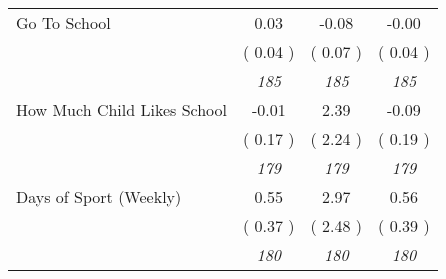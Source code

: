 \begin{tabular}{l c c c}
Go To School &      0.03 &     -0.08 &     -0.00 \\
& (     0.04 ) & (     0.07 ) & (     0.04 ) \\
& \textit{ 185 } & \textit{ 185 } & \textit{ 185 } \\
How Much Child Likes School &     -0.01 &      2.39 &     -0.09 \\
& (     0.17 ) & (     2.24 ) & (     0.19 ) \\
& \textit{ 179 } & \textit{ 179 } & \textit{ 179 } \\
Days of Sport (Weekly) &      0.55 &      2.97 &      0.56 \\
& (     0.37 ) & (     2.48 ) & (     0.39 ) \\
& \textit{ 180 } & \textit{ 180 } & \textit{ 180 } \\
\bottomrule
\end{tabular}
